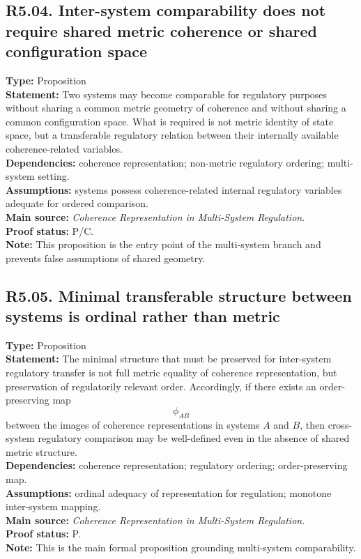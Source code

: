 \documentclass[12pt]{article}
\begin{document}
	\subsection*{R5.04. Inter-system comparability does not require shared metric coherence or shared configuration space}
	\textbf{Type:} Proposition \\
	\textbf{Statement:} Two systems may become comparable for regulatory purposes without sharing a
	common metric geometry of coherence and without sharing a common configuration space. What is
	required is not metric identity of state space, but a transferable regulatory relation between
	their internally available coherence-related variables. \\
	\textbf{Dependencies:} coherence representation; non-metric regulatory ordering; multi-system
	setting. \\
	\textbf{Assumptions:} systems possess coherence-related internal regulatory variables adequate
	for ordered comparison. \\
	\textbf{Main source:} \emph{Coherence Representation in Multi-System Regulation}. \\
	\textbf{Proof status:} P/C. \\
	\textbf{Note:} This proposition is the entry point of the multi-system branch and prevents false
	assumptions of shared geometry.
	
	\subsection*{R5.05. Minimal transferable structure between systems is ordinal rather than metric}
	\textbf{Type:} Proposition \\
	\textbf{Statement:} The minimal structure that must be preserved for inter-system regulatory
	transfer is not full metric equality of coherence representation, but preservation of
	regulatorily relevant order. Accordingly, if there exists an order-preserving map
	\[
	\phi_{AB}
	\]
	between the images of coherence representations in systems $A$ and $B$, then cross-system
	regulatory comparison may be well-defined even in the absence of shared metric structure. \\
	\textbf{Dependencies:} coherence representation; regulatory ordering; order-preserving map. \\
	\textbf{Assumptions:} ordinal adequacy of representation for regulation; monotone inter-system
	mapping. \\
	\textbf{Main source:} \emph{Coherence Representation in Multi-System Regulation}. \\
	\textbf{Proof status:} P. \\
	\textbf{Note:} This is the main formal proposition grounding multi-system comparability.
	
\end{document}
